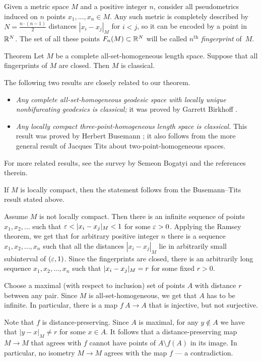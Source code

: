 \documentclass[a4paper,10pt]{article}
\begin{document}
Given a metric space $M$ and a positive integer $n$, consider all pseudometrics induced on $n$ points $x_1,\dots, x_n\in M$.
Any such metric is completely described by $N=\tfrac{n\cdot (n-1)}2$ distances $|x_i-x_j|_M$ for $i<j$, so it can be encoded by a point in $\mathbb{R}^N$.
The set of all these points $F_n(M)\subset \mathbb{R}^N$ will be called \emph{$n^\text{th}$ fingerprint} of~$M$.

\begin{thm}{Theorem}\label{all-sets}
Let $M$ be a complete all-set-homogeneous length space.
Suppose that all fingerprints of $M$ are closed.
Then $M$ is classical.
\end{thm}

The following two results are closely related to our theorem.
\begin{itemize}
\item \emph{Any complete all-set-homogeneous geodesic space with locally unique nonbifurcating geodesics is classical;} it was proved by Garrett Birkhoff \cite{birkhoff}.
\item \emph{Any locally compact three-point-homogeneous length space is classical.}
 This result was proved by Herbert Busemann \cite{busemann}; it also follows from the more general result of Jacques Tits \cite{tits} about two-point-homogeneous spaces.
\end{itemize}
For more related results, see the survey by Semeon Bogatyi \cite{bogaty} and the references therein.

If $M$ is locally compact, then the statement follows from the Busemann--Tits result stated above.

Assume $M$ is not locally compact.
Then there is an infinite sequence of points $x_1,x_2,\dots$ such that 
$\eps<|x_i-x_j|_M<1$ for some $\varepsilon>0$.
Applying the Ramsey theorem, we get that for arbitrary positive integer $n$ there is a sequence $x_1,x_2,\dots,x_n$ such that all the distances
$|x_i-x_j|_M$ lie in arbitrarily small subinterval of $(\varepsilon,1)$.
Since the fingerprints are closed, there is an arbitrarily long sequence 
$x_1,x_2,\dots,x_n$ such that 
$|x_i\z-x_j|_M= r$ for some fixed $r>0$.

Choose a maximal (with respect to inclusion) set of points $A$ with distance $r$ between any pair.
Since $M$ is all-set-homogeneous, we get that $A$ has to be infinite.
In particular, there is a map $f\:A\to A$ that is injective, but not surjective.

Note that $f$ is distance-preserving.
Since $A$ is maximal, for any $y\notin A$ we have that $|y-x|_M\ne r$ for some $x\in A$.
It follows that a distance-preserving map $M\to M$ that agrees with $f$ cannot have points of $A\setminus f(A)$ in its image.
In particular, no isometry $M\to M$ agrees with the map $f$ --- a contradiction.
\qeds
\end{document}
